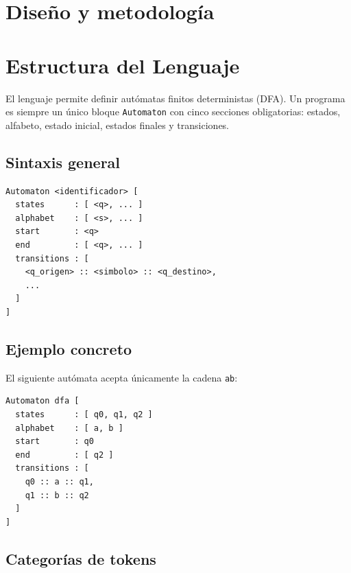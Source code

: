 \documentclass{article}
\begin{document}
\section{Diseño y metodología}




\section{Estructura del Lenguaje}

El lenguaje permite definir autómatas finitos deterministas (DFA).
Un programa es siempre un único bloque \texttt{Automaton} con cinco secciones obligatorias:
estados, alfabeto, estado inicial, estados finales y transiciones.

\subsection{Sintaxis general}

\begin{verbatim}
Automaton <identificador> [
  states      : [ <q>, ... ]
  alphabet    : [ <s>, ... ]
  start       : <q>
  end         : [ <q>, ... ]
  transitions : [
    <q_origen> :: <simbolo> :: <q_destino>,
    ...
  ]
]
\end{verbatim}

\subsection{Ejemplo concreto}

El siguiente autómata acepta únicamente la cadena \texttt{ab}:

\begin{verbatim}
Automaton dfa [
  states      : [ q0, q1, q2 ]
  alphabet    : [ a, b ]
  start       : q0
  end         : [ q2 ]
  transitions : [
    q0 :: a :: q1,
    q1 :: b :: q2
  ]
]
\end{verbatim}

\subsection{Categorías de tokens}
\end{document}
